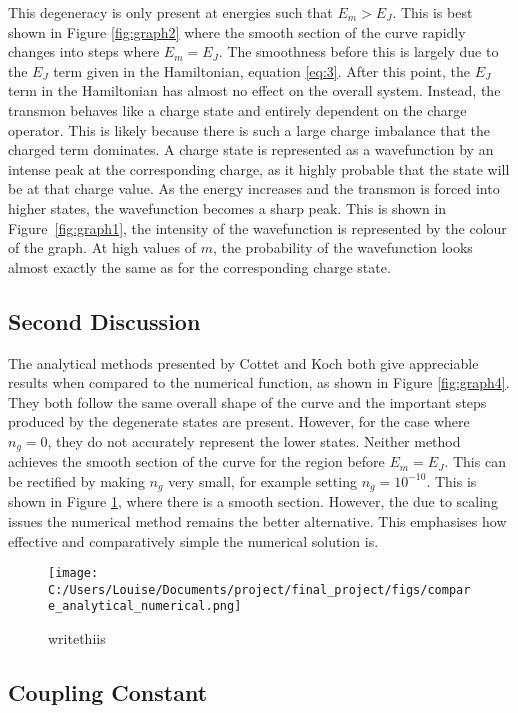 \documentclass[11pt]{article}
\begin{document}
This degeneracy is only present at energies such that $E_m > E_J$. This is best shown in Figure \ref{fig:graph2} where the smooth section of the curve rapidly changes into steps where $E_m = E_J$. The smoothness before this is largely due to the $E_J$ term given in the Hamiltonian, equation \ref{eq:3}. After this point, the $E_J$ term in the Hamiltonian has almost no effect on the overall system. Instead, the transmon behaves like a charge state and entirely dependent on the charge operator. This is likely because there is such a large charge imbalance that the charged term dominates. A charge state is represented as a wavefunction by an intense peak at the corresponding charge, as it highly probable that the state will be at that charge value. As the energy increases and the transmon is forced into higher states, the wavefunction becomes a sharp peak. This is shown in Figure~\ref{fig:graph1}, the intensity of the wavefunction is represented by the colour of the graph. At high values of $m$, the probability of the wavefunction looks almost exactly the same as for the corresponding charge state.

\subsection{Second Discussion}
The analytical methods presented by Cottet and Koch both give appreciable results when compared to the numerical function, as shown in Figure \ref{fig:graph4}. They both follow the same overall shape of the curve and the important steps produced by the degenerate states are present. However, for the case where $n_g = 0$, they do not accurately represent the lower states. Neither method achieves the smooth section of the curve for the region before $E_m = E_J$. This can be rectified by making $n_g$ very small, for example setting $n_g = 10^{-10}$. This is shown in Figure \ref{fig:graph6}, where there is a smooth section. However, the due to scaling issues the numerical method remains the better alternative. This emphasises how effective and comparatively simple the numerical solution is.
\begin{figure}[ht]
\centering
\texttt{[image: C:/Users/Louise/Documents/project/final\_project/figs/compare\_analytical\_numerical.png]}
\caption{writethiis}
\label{fig:graph6}
\end{figure}

\subsection{Coupling Constant}
\end{document}
